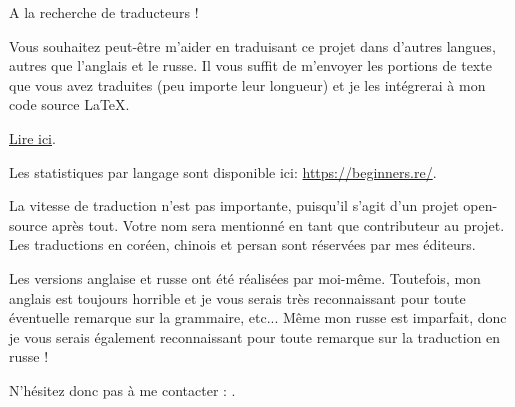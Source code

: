 ﻿\vspace*{\fill}

\Huge A la recherche de traducteurs !

\normalsize

\bigskip
\bigskip
\bigskip

Vous souhaitez peut-être m'aider en traduisant ce projet dans d'autres langues, autres que l'anglais et le russe.
Il vous suffit de m'envoyer les portions de texte que vous avez traduites (peu importe leur longueur) et je les intégrerai à mon code source LaTeX.

\href{\RepoURL/Translation.md}{Lire ici}.

Les statistiques par langage sont disponible ici: \url{https://beginners.re/}.

La vitesse de traduction n'est pas importante, puisqu'il s'agit d'un projet open-source après tout.
Votre nom sera mentionné en tant que contributeur au projet.
Les traductions en coréen, chinois et persan sont réservées par mes éditeurs.

Les versions anglaise et russe ont été réalisées par moi-même.
Toutefois, mon anglais est toujours horrible et je vous serais très reconnaissant pour toute éventuelle remarque sur la grammaire, etc...
Même mon russe est imparfait, donc je vous serais également reconnaissant pour toute remarque sur la traduction en russe !%

N'hésitez donc pas à me contacter : \GTT{\EMAILS}.

\vspace*{\fill}
\vfill
